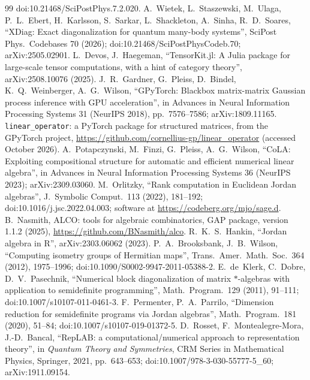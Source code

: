 \documentclass[11pt]{article}
\begin{document}
{\begin{thebibliography}{99}
  doi:10.21468/SciPostPhys.7.2.020.
 A.~Wietek, L.~Staszewski, M.~Ulaga, P.~L.~Ebert, H.~Karlsson, S.~Sarkar, L.~Shackleton,
  A.~Sinha, R.~D.~Soares, ``XDiag: Exact diagonalization for quantum many-body systems'', SciPost Phys.\ Codebases 70
  (2026); doi:10.21468/SciPostPhysCodeb.70; arXiv:2505.02901.
 L.~Devos, J.~Haegeman, ``TensorKit.jl: A Julia package for large-scale tensor computations, with a
  hint of category theory'', arXiv:2508.10076 (2025).
 J.~R.~Gardner, G.~Pleiss, D.~Bindel, K.~Q.~Weinberger, A.~G.~Wilson, ``GPyTorch: Blackbox
  matrix-matrix Gaussian process inference with GPU acceleration'', in Advances in Neural Information Processing
  Systems 31 (NeurIPS 2018), pp.~7576--7586; arXiv:1809.11165.
 \texttt{linear\_operator}: a PyTorch package for structured matrices, from the GPyTorch
  project, \url{https://github.com/cornellius-gp/linear_operator} (accessed October 2026).
 A.~Potapczynski, M.~Finzi, G.~Pleiss, A.~G.~Wilson, ``CoLA: Exploiting compositional
  structure for automatic and efficient numerical linear algebra'', in Advances in Neural Information Processing
  Systems 36 (NeurIPS 2023); arXiv:2309.03060.
 M.~Orlitzky, ``Rank computation in Euclidean Jordan algebras'', J.\ Symbolic Comput.\ 113
  (2022), 181--192; doi:10.1016/j.jsc.2022.04.003; software at \url{https://codeberg.org/mjo/sage.d}.
 B.~Nasmith, ALCO: tools for algebraic combinatorics, GAP package, version 1.1.2 (2025),
  \url{https://github.com/BNasmith/alco}.
 R.~K.~S.~Hankin, ``Jordan algebra in R'', arXiv:2303.06062 (2023).
 P.~A.~Brooksbank, J.~B.~Wilson, ``Computing isometry groups of Hermitian maps'', Trans.\ Amer.\
  Math.\ Soc.\ 364 (2012), 1975--1996; doi:10.1090/S0002-9947-2011-05388-2.
\bibitem{deklerk2011} E.~de~Klerk, C.~Dobre, D.~V.~Pasechnik, ``Numerical block diagonalization of matrix $*$-algebras
  with application to semidefinite programming'', Math.\ Program.\ 129 (2011), 91--111; doi:10.1007/s10107-011-0461-3.
\bibitem{permenter2020} F.~Permenter, P.~A.~Parrilo, ``Dimension reduction for semidefinite programs via Jordan
  algebras'', Math.\ Program.\ 181 (2020), 51--84; doi:10.1007/s10107-019-01372-5.
\bibitem{rosset2021} D.~Rosset, F.~Montealegre-Mora, J.-D.~Bancal, ``RepLAB: a computational/numerical approach to
  representation theory'', in \emph{Quantum Theory and Symmetries}, CRM Series in Mathematical Physics, Springer, 2021,
  pp.~643--653; doi:10.1007/978-3-030-55777-5\_60; arXiv:1911.09154.

\end{thebibliography}}
\end{document}
